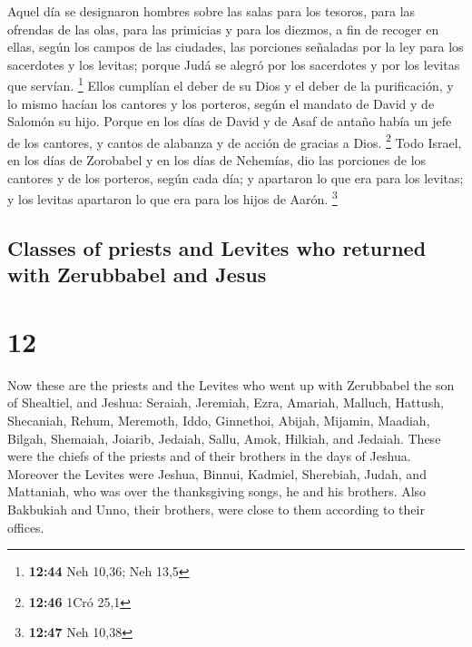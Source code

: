 \begin{paracol}{2}
 Aquel día se designaron hombres sobre las salas para los
tesoros, para las ofrendas de las olas, para las primicias y para los
diezmos, a fin de recoger en ellas, según los campos de las ciudades,
las porciones señaladas por la ley para los sacerdotes y los levitas;
porque Judá se alegró por los sacerdotes y por los levitas que servían.
\footnote{\textbf{12:44} Neh 10,36; Neh 13,5}  Ellos
cumplían el deber de su Dios y el deber de la purificación, y lo mismo
hacían los cantores y los porteros, según el mandato de David y de
Salomón su hijo.  Porque en los días de David y de Asaf
de antaño había un jefe de los cantores, y cantos de alabanza y de
acción de gracias a Dios. \footnote{\textbf{12:46} 1Cró 25,1}
 Todo Israel, en los días de Zorobabel y en los días de
Nehemías, dio las porciones de los cantores y de los porteros, según
cada día; y apartaron lo que era para los levitas; y los levitas
apartaron lo que era para los hijos de Aarón. \footnote{\textbf{12:47}
  Neh 10,38}

\switchcolumn
\begin{otherlanguage}{english}

\hypertarget{classes-of-priests-and-levites-who-returned-with-zerubbabel-and-jesus}{%
\subsection{Classes of priests and Levites who returned with Zerubbabel
and
Jesus}\label{classes-of-priests-and-levites-who-returned-with-zerubbabel-and-jesus}}

\hypertarget{section-23}{%
\section{12}\label{section-23}}

 Now these are the priests and the Levites who went up
with Zerubbabel the son of Shealtiel, and Jeshua: Seraiah, Jeremiah,
Ezra,  Amariah, Malluch, Hattush, 
Shecaniah, Rehum, Meremoth,  Iddo, Ginnethoi, Abijah,
 Mijamin, Maadiah, Bilgah,  Shemaiah,
Joiarib, Jedaiah,  Sallu, Amok, Hilkiah, and Jedaiah.
These were the chiefs of the priests and of their brothers in the days
of Jeshua.  Moreover the Levites were Jeshua, Binnui,
Kadmiel, Sherebiah, Judah, and Mattaniah, who was over the thanksgiving
songs, he and his brothers.  Also Bakbukiah and Unno,
their brothers, were close to them according to their offices.


\end{otherlanguage}
\end{paracol}
